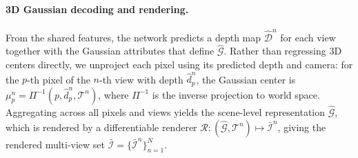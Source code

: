 \paragraph{3D Gaussian decoding and rendering.}
From the shared features, the network predicts a depth map $\hat{\mathcal{D}}^n$ for each view together with the Gaussian attributes that define $\hat{\mathcal{G}}$. Rather than regressing 3D centers directly, we unproject each pixel using its predicted depth and camera: for the $p$-th pixel of the $n$-th view with depth $\hat d_p^n$, the Gaussian center is $\mu_p^n=\Pi^{-1}(p,\hat d_p^n,\mathcal{T}^n)$, where $\Pi^{-1}$ is the inverse projection to world space. Aggregating across all pixels and views yields the scene-level representation $\hat{\mathcal{G}}$, which is rendered by a differentiable renderer $\mathcal{R}:(\hat{\mathcal{G}},\mathcal{T}^n)\mapsto \bar{\mathcal{I}}^n$, giving the rendered multi-view set $\bar{\mathcal{I}}=\{\bar{\mathcal{I}}^n\}_{n=1}^{N}$.


